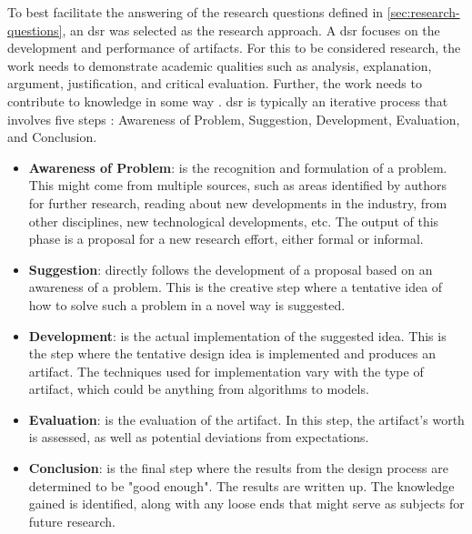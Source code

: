 To best facilitate the answering of the research questions defined in \cref{sec:research-questions}, an \acrfull{dsr} was selected as the research approach. A \acrshort{dsr} focuses on the development and performance of artifacts. For this to be considered research, the work needs to demonstrate academic qualities such as analysis, explanation, argument, justification, and critical evaluation. Further, the work needs to contribute to knowledge in some way \cite{oates2006researching}.
\acrshort{dsr} is typically an iterative process that involves five steps \cite{vaishnavi2004design}: Awareness of Problem, Suggestion, Development, Evaluation, and Conclusion.
\begin{itemize}
    \item \textbf{Awareness of Problem}: is the recognition and formulation of a problem. This might come from multiple sources, such as areas identified by authors for further research, reading about new developments in the industry, from other disciplines, new technological developments, etc. The output of this phase is a proposal for a new research effort, either formal or informal.
    \item \textbf{Suggestion}: directly follows the development of a proposal based on an awareness of a problem. This is the creative step where a tentative idea of how to solve such a problem in a novel way is suggested.
    \item \textbf{Development}: is the actual implementation of the suggested idea. This is the step where the tentative design idea is implemented and produces an artifact. The techniques used for implementation vary with the type of artifact, which could be anything from algorithms to models.
    \item \textbf{Evaluation}: is the evaluation of the artifact. In this step, the artifact's worth is assessed, as well as potential deviations from expectations. 
    \item \textbf{Conclusion}: is the final step where the results from the design process are determined to be "good enough". The results are written up. The knowledge gained is identified, along with any loose ends that might serve as subjects for future research.
\end{itemize}

